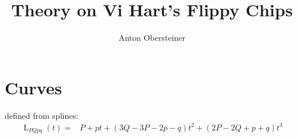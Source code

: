 \documentclass[10pt]{article}
\title{Theory on Vi Hart's Flippy Chips}
\author{Anton Obersteiner}
\newcommand\samplesTikz{30}
\DeclareMathOperator{\Lspline}{L}
\begin{document}
\maketitle

\section{Curves}
    defined from splines:
    $$\begin{aligned}
        \Lspline_{PQpq}(t) =& P + pt + (3Q-3P-2p-q)t^2 + (2P-2Q+p+q)t^3 \\
    \end{aligned}$$
\end{document}
